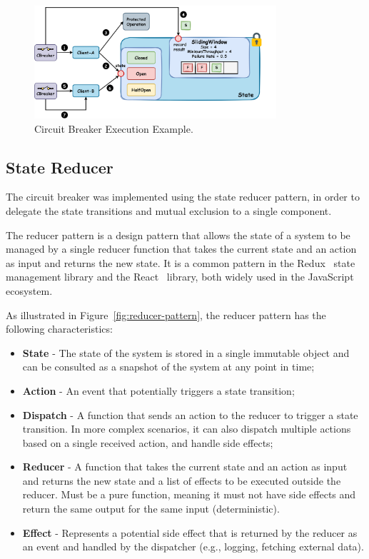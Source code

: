 \begin{figure}[!htb]
    \centering
    \includegraphics[width=0.8\textwidth]{../figures/05_cbreaker-execution-example}
    \caption{Circuit Breaker Execution Example.}
    \label{fig:circuit-breaker-execution-example}
\end{figure}

\subsection{State Reducer}\label{subsec:cbreaker-state-reducer}

The circuit breaker was implemented using the state reducer pattern,
in order to delegate the state transitions and mutual exclusion to a single component.

The reducer pattern is a design pattern
that allows the state of a system
to be managed by a single reducer function
that takes the current state and an action as input and returns the new state.
It is a common pattern in the Redux~\cite{redux} state management library and the React~\cite{react-use-reducer} library,
both widely used in the JavaScript ecosystem.

As illustrated in Figure~\ref{fig:reducer-pattern}, the reducer pattern has the following characteristics:

\begin{itemize}
    \item \textbf{State} - The state of the system is stored in a single immutable object and can be consulted as a snapshot of the system at any point in time;
    \item \textbf{Action} - An event that potentially triggers a state transition;
    \item \textbf{Dispatch} - A function that sends an action to the reducer to trigger a state transition.
    In more complex scenarios, it can also dispatch multiple actions based on a single received action, and handle side effects;
    \item \textbf{Reducer} - A function that takes the current state and an action as input and returns the new state and a list of effects to be executed outside the reducer.
    Must be a pure function, meaning it must not have side effects and return the same output for the same input (deterministic).
    \item \textbf{Effect} -
    Represents a potential side effect that is returned by the reducer as an event and handled by the dispatcher (e.g., logging, fetching external data).
\end{itemize}

